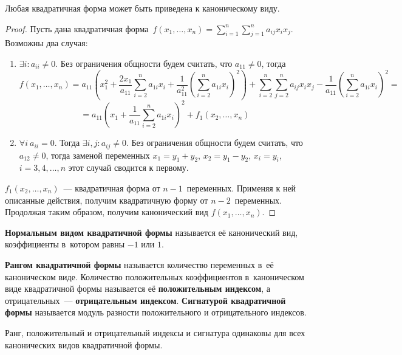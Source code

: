 \begin{theorem}
Любая квадратичная форма может быть приведена к каноническому виду.
\end{theorem}
\begin{proof}
Пусть дана квадратичная форма~$\displaystyle f(x_1, \ldots, x_n) = \sum_{i=1}^n \sum_{j=1}^n a_{ij} x_i x_j$.
Возможны два случая:
\begin{enumerate}
	\item $\exists i \colon a_{ii} \neq 0$.
	Без ограничения общности будем считать, что $a_{11} \neq 0$, тогда
	\begin{equation*}
	f(x_1, \ldots, x_n) = a_{11}\left( x_1^2 + \frac{2 x_1}{a_{11}} \sum_{i=2}^n a_{1i} x_i + \frac1{a_{11}^2} \left( \sum_{i=2}^n a_{1i} x_i \right)^2 \right) + \sum_{i=2}^n \sum_{j=2}^n a_{ij} x_i x_j - \frac1{a_{11}} \left( \sum_{i=2}^n a_{1i} x_i \right)^2 =
	\end{equation*}
	\begin{equation*}
	= a_{11}\left( x_1 + \frac1{a_{11}} \sum_{i=2}^n a_{1i} x_i \right)^2 + f_1(x_2, \ldots, x_n)
	\end{equation*}
	
	\item $\forall i \ a_{ii} = 0$.
	Тогда $\exists i, j \colon a_{ij} \neq 0$.
	Без ограничения общности будем считать, что $a_{12} \neq 0$, тогда заменой переменных $x_1 = y_1 + y_2$, $x_2 = y_1 - y_2$, $x_i = y_i$, $i = 3, 4, \ldots, n$ этот случай сводится к первому.
\end{enumerate}

$f_1(x_2, \ldots, x_n)$~--- квадратичная форма от $n - 1$~переменных.
Применяя к ней описанные действия, получим квадратичную форму от $n - 2$~переменных.
Продолжая таким образом, получим канонический вид $f(x_1, \ldots, x_n)$.
\end{proof}

\textbf{Нормальным видом квадратичной формы} называется её канонический вид, коэффициенты в~котором равны $-1$ или $1$.

\textbf{Рангом квадратичной формы} называется количество переменных в~её каноническом виде.
Количество положительных коэффициентов в~каноническом виде квадратичной формы называется её \textbf{положительным индексом}, а отрицательных~--- \textbf{отрицательным индексом}.
\textbf{Сигнатурой квадратичной формы} называется модуль разности положительного и отрицательного индексов.

Ранг, положительный и отрицательный индексы и сигнатура одинаковы для всех канонических видов квадратичной формы.